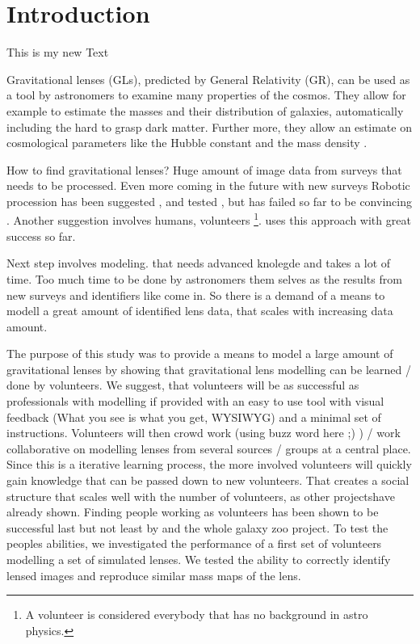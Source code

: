 \section{Introduction}

This is my new Text



Gravitational lenses (GLs), predicted by General Relativity (GR), can be used as a tool by astronomers to examine many properties of the cosmos.
They allow for example to estimate the masses and their distribution of galaxies, automatically including the hard to grasp dark matter.
Further more, they allow an estimate on cosmological parameters like the Hubble constant \citep{Saha2006} and the mass density \needcite.


How to find gravitational lenses? Huge amount of image data from surveys that needs to be processed.
Even more coming in the future with new surveys \needcite
Robotic procession has been suggested \needcite, and tested \needcite, but has failed so far to be convincing \needcite.
Another suggestion involves humans, volunteers \footnote{A volunteer is considered everybody that has no background in astro physics.}.
\sw uses this approach with great success so far.\needcite


Next step involves modeling. that needs advanced knolegde and takes a lot of time.
Too much time to be done by astronomers them selves as the results from new surveys and identifiers like \sw come in.
So there is a demand of a means to modell a great amount of identified lens data, that scales with increasing data amount.


The purpose of this study was to provide a means to model a large amount of gravitational lenses by showing that gravitational lens modelling can be learned / done by volunteers.
We suggest, that volunteers will be as successful as professionals with modelling if provided with an easy to use tool with visual feedback (What you see is what you get, WYSIWYG) and a minimal set of instructions.
Volunteers will then crowd work (using buzz word here ;) ) / work collaborative on modelling lenses from several sources / groups at a central place.
Since this is a iterative learning process, the more involved volunteers will quickly gain knowledge that can be passed down to new volunteers.
That creates a social structure that scales well with the number of volunteers, as other projects\needcite have already shown.
Finding people working as volunteers has been shown to be successful last but not least by \sw and the whole galaxy zoo project.
To test the peoples abilities, we investigated the performance of a first set of volunteers modelling a set of simulated lenses.
We tested the ability to correctly identify lensed images and reproduce similar mass maps of the lens.
